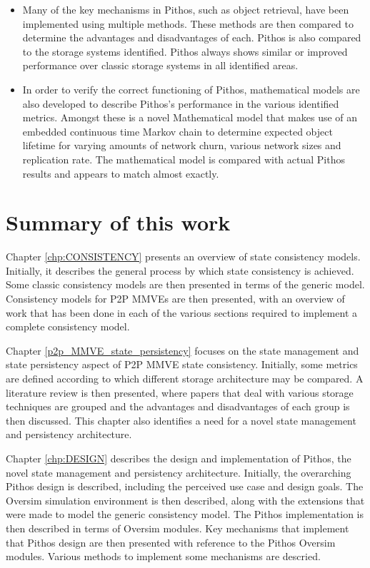 \begin{itemize}
\item Many of the key mechanisms in Pithos, such as object retrieval, have been implemented using multiple methods. These methods are then compared to determine the advantages and disadvantages of each. Pithos is also compared to the storage systems identified. Pithos always shows similar or improved performance over classic storage systems in all identified areas.

\item In order to verify the correct functioning of Pithos, mathematical models are also developed to describe Pithos's performance in the various identified metrics. Amongst these is a novel Mathematical model that makes use of an embedded continuous time Markov chain to determine expected object lifetime for varying amounts of network churn, various network sizes and replication rate. The mathematical model is compared with actual Pithos results and appears to match almost exactly.
\end{itemize}

\section{Summary of this work}

Chapter \ref{chp:CONSISTENCY} presents an overview of state consistency models. Initially, it describes the general process by which state consistency is achieved. Some classic consistency models are then presented in terms of the generic model. Consistency models for P2P MMVEs are then presented, with an overview of work that has been done in each of the various sections required to implement a complete consistency model.

Chapter \ref{p2p_MMVE_state_persistency} focuses on the state management and state persistency aspect of P2P MMVE state consistency. Initially, some metrics are defined according to which different storage architecture may be compared. A literature review is then presented, where papers that deal with various storage techniques are grouped and the advantages and disadvantages of each group is then discussed. This chapter also identifies a need for a novel state management and persistency architecture.

Chapter \ref{chp:DESIGN} describes the design and implementation of Pithos, the novel state management and persistency architecture. Initially, the overarching Pithos design is described, including the perceived use case and design goals. The Oversim simulation environment is then described, along with the extensions that were made to model the generic consistency model. The Pithos implementation is then described in terms of Oversim modules. Key mechanisms that implement that Pithos design are then presented with reference to the Pithos Oversim modules. Various methods to implement some mechanisms are descried.

